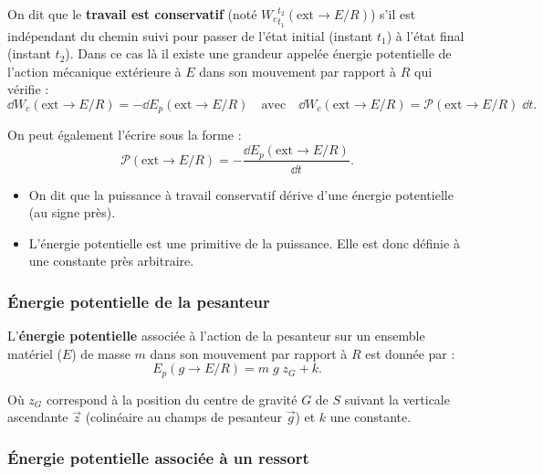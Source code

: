 \documentclass[10pt,fleqn]{article} %
\begin{document}
\begin{defi}
On dit que le \textbf{travail est conservatif} (noté $\displaystyle{{W_c}^{t_2}_{t_1}}(\text{ext} \rightarrow E/R)$) s'il est indépendant du chemin suivi pour passer de l'état initial (instant $t_1$) à l'état final (instant $t_2$).
Dans ce cas là il existe une grandeur appelée énergie potentielle de l'action mécanique extérieure à $E$ dans son mouvement par rapport à $R$ qui vérifie :
$$
\dd W_c(\text{ext} \rightarrow E/R)=-\dd E_p(\text{ext} \rightarrow E/R) \quad
\text{avec}
\quad
\dd W_c(\text{ext} \rightarrow E/R)=\mathcal{P}(\text{ext} \rightarrow E/R)\;\dd t.
$$

On peut également l'écrire sous la forme :
$$
\mathcal{P}(\text{ext} \rightarrow E/R)=-\frac{\dd E_p(\text{ext} \rightarrow E/R)}{\dd t}.
$$
\end{defi}

\begin{rem}%
\begin{itemize}
\item On dit que la puissance à travail conservatif dérive d'une énergie potentielle (au signe près).
\item L'énergie potentielle est une primitive de la puissance. Elle est donc définie à une constante près arbitraire.
\end{itemize}
\end{rem}%
\subsubsection{Énergie potentielle de la pesanteur}



\begin{defi}
L'\textbf{énergie potentielle} associée à l'action de la pesanteur sur un ensemble matériel ($E$) de masse $m$ dans son mouvement par rapport à $R$ est donnée par :
$$
E_p(g \rightarrow E/R)=m\;g\;z_G + k.
$$

Où $z_G$ correspond à la position du centre de gravité $G$ de $S$ suivant la verticale ascendante $\overrightarrow{z}$ (colinéaire au champs de pesanteur $\overrightarrow{g}$) et $k$ une constante.

\end{defi}



\subsubsection{Énergie potentielle associée à un ressort}
\end{document}
